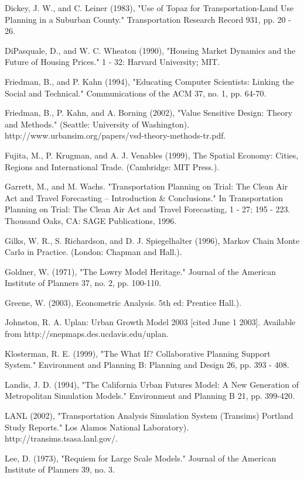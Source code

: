 Dickey, J. W., and C. Leiner (1983), "Use of Topaz for Transportation-Land Use Planning in a Suburban County." Transportation Research Record 931, pp. 20 - 26.

DiPasquale, D., and W. C. Wheaton (1990), "Housing Market Dynamics and the Future of Housing Prices." 1 - 32: Harvard University; MIT.

Friedman, B., and P. Kahn (1994), "Educating Computer Scientists: Linking the Social and Technical." Communications of the ACM 37, no. 1, pp. 64-70.

Friedman, B., P. Kahn, and A. Borning (2002), "Value Sensitive Design: Theory and Methods." (Seattle: University of Washington). http://www.urbansim.org/papers/vsd-theory-methods-tr.pdf.

Fujita, M., P. Krugman, and A. J. Venables (1999), The Spatial Economy: Cities, Regions and International Trade. (Cambridge: MIT Press.).

Garrett, M., and M. Wachs. "Transportation Planning on Trial: The Clean Air Act and Travel Forecasting -- Introduction \& Conclusions." In Transportation Planning on Trial: The Clean Air Act and Travel Forecasting, 1 - 27; 195 - 223. Thousand Oaks, CA: SAGE Publications, 1996.

Gilks, W. R., S. Richardson, and D. J. Spiegelhalter (1996), Markov Chain Monte Carlo in Practice. (London: Chapman and Hall.).

Goldner, W. (1971), "The Lowry Model Heritage." Journal of the American Institute of Planners 37, no. 2, pp. 100-110.

Greene, W. (2003), Econometric Analysis. 5th ed: Prentice Hall.).

Johnston, R. A. Uplan: Urban Growth Model 2003 [cited June 1 2003]. Available from http://snepmaps.des.ucdavis.edu/uplan.

Klosterman, R. E. (1999), "The What If? Collaborative Planning Support System." Environment and Planning B: Planning and Design 26, pp. 393 - 408.

Landis, J. D. (1994), "The California Urban Futures Model: A New Generation of Metropolitan Simulation Models." Environment and Planning B 21, pp. 399-420.

LANL (2002), "Transportation Analysis Simulation System (Transims) Portland Study Reports." Los Alamos National Laboratory). http://transims.tsasa.lanl.gov/.

Lee, D. (1973), "Requiem for Large Scale Models." Journal of the American Institute of Planners 39, no. 3.

